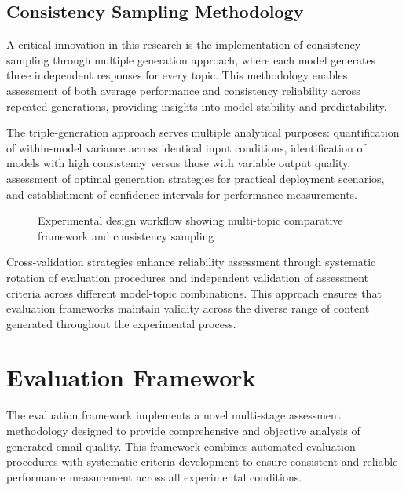 \subsection{Consistency Sampling Methodology}

A critical innovation in this research is the implementation of consistency sampling through multiple generation approach, where each model generates three independent responses for every topic. This methodology enables assessment of both average performance and consistency reliability across repeated generations, providing insights into model stability and predictability.

The triple-generation approach serves multiple analytical purposes: quantification of within-model variance across identical input conditions, identification of models with high consistency versus those with variable output quality, assessment of optimal generation strategies for practical deployment scenarios, and establishment of confidence intervals for performance measurements.

\begin{figure}[htbp]
    \centering
    \caption{Experimental design workflow showing multi-topic comparative framework and consistency sampling}
    \label{fig:experimental-design}
\end{figure}

Cross-validation strategies enhance reliability assessment through systematic rotation of evaluation procedures and independent validation of assessment criteria across different model-topic combinations. This approach ensures that evaluation frameworks maintain validity across the diverse range of content generated throughout the experimental process.

\section{Evaluation Framework}
\label{sec:evaluation-framework}

The evaluation framework implements a novel multi-stage assessment methodology designed to provide comprehensive and objective analysis of generated email quality. This framework combines automated evaluation procedures with systematic criteria development to ensure consistent and reliable performance measurement across all experimental conditions.

